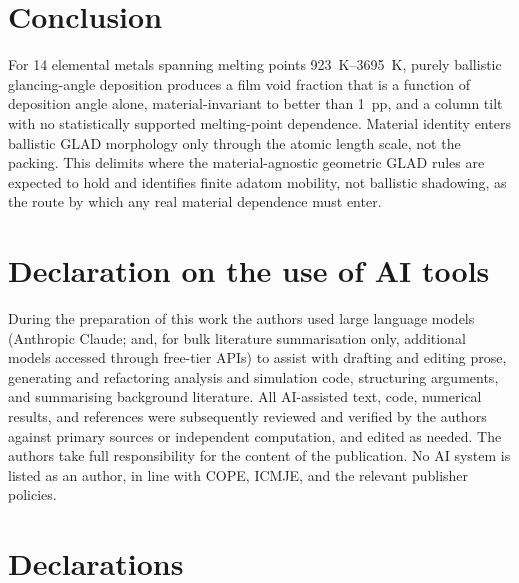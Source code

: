 \documentclass[aip,jcp,amsmath,amssymb,reprint]{revtex4-1}
\begin{document}
\section{Conclusion}
\label{sec:conclusion}

For \num{14} elemental metals spanning melting points \SIrange{923}{3695}{K},
purely ballistic glancing-angle deposition produces a film void fraction that is
a function of deposition angle alone, material-invariant to better than
\SI{1}{pp}, and a column tilt with no statistically supported melting-point
dependence. Material identity enters ballistic GLAD morphology only through the
atomic length scale, not the packing. This delimits where the material-agnostic
geometric GLAD rules are expected to hold and identifies finite adatom mobility,
not ballistic shadowing, as the route by which any real material dependence must
enter.

\section*{Declaration on the use of AI tools}
During the preparation of this work the authors used large language models
(Anthropic Claude; and, for bulk literature summarisation only, additional
models accessed through free-tier APIs) to assist with drafting and editing
prose, generating and refactoring analysis and simulation code, structuring
arguments, and summarising background literature. All AI-assisted text, code,
numerical results, and references were subsequently reviewed and verified by the
authors against primary sources or independent computation, and edited as
needed. The authors take full responsibility for the content of the publication.
No AI system is listed as an author, in line with COPE, ICMJE, and the relevant
publisher policies.

\section*{Declarations}
\end{document}
